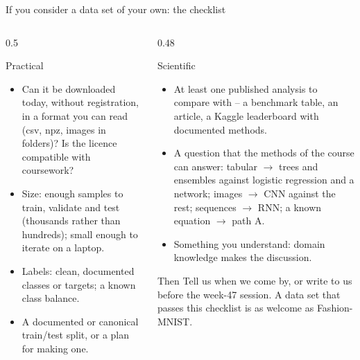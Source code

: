 \documentclass[10pt,aspectratio=169]{beamer}
\begin{document}
\begin{frame}{If you consider a data set of your own: the checklist}
\footnotesize
\begin{columns}[T]
\begin{column}{0.5\textwidth}
\begin{block}{Practical}
\begin{itemize}
  \item Can it be downloaded today, without registration, in a format you
        can read (csv, npz, images in folders)?  Is the licence compatible
        with coursework?
  \item Size: enough samples to train, validate and test (thousands rather
        than hundreds); small enough to iterate on a laptop.
  \item Labels: clean, documented classes or targets; a known class balance.
  \item A documented or canonical train/test split, or a plan for making
        one.
\end{itemize}
\end{block}
\end{column}
\begin{column}{0.48\textwidth}
\begin{block}{Scientific}
\begin{itemize}
  \item At least one published analysis to compare with -- a benchmark
        table, an article, a Kaggle leaderboard with documented methods.
  \item A question that the methods of the course can answer: tabular
        $\to$ trees and ensembles against logistic regression and a network;
        images $\to$ CNN against the rest; sequences $\to$ RNN; a known
        equation $\to$ path A.
  \item Something you understand: domain knowledge makes the discussion.
\end{itemize}
\end{block}
\begin{block}{Then}
Tell us when we come by, or write to us before the week-47 session.  A
data set that passes this checklist is as welcome as Fashion-MNIST.
\end{block}
\end{column}
\end{columns}
\end{frame}
\end{document}
